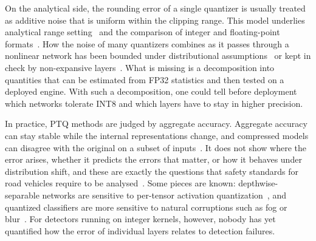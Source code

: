 \documentclass[pdflatex,sn-mathphys-num]{sn-jnl}%
\theoremstyle{thmstyleone}%
\theoremstyle{thmstyletwo}%
\theoremstyle{thmstylethree}%
\begin{document}
On the analytical side, the rounding error of a single quantizer is usually treated as additive noise that is uniform within the clipping range. This model underlies analytical range setting~\cite{banner2019aciq,nagel2021whitepaper} and the comparison of integer and floating-point formats~\cite{kuzmin2022fp8,vanbaalen2023fp8}. How the noise of many quantizers combines as it passes through a nonlinear network has been bounded under distributional assumptions~\cite{sakr2017analytical} or kept in check by non-expansive layers~\cite{lin2019defensive}. What is missing is a decomposition into quantities that can be estimated from FP32 statistics and then tested on a deployed engine. With such a decomposition, one could tell before deployment which networks tolerate INT8 and which layers have to stay in higher precision.

In practice, PTQ methods are judged by aggregate accuracy. Aggregate accuracy can stay stable while the internal representations change, and compressed models can disagree with the original on a subset of inputs~\cite{hooker2019forget}. It does not show where the error arises, whether it predicts the errors that matter, or how it behaves under distribution shift, and these are exactly the questions that safety standards for road vehicles require to be analysed~\cite{iso21448,iso8800,mohseni2022taxonomy}. Some pieces are known: depthwise-separable networks are sensitive to per-tensor activation quantization~\cite{sheng2018quantization,wu2020integer}, and quantized classifiers are more sensitive to natural corruptions such as fog or blur~\cite{xiao2023robustness,michaelis2019benchmarking,zhang2023adverse}. For detectors running on integer kernels, however, nobody has yet quantified how the error of individual layers relates to detection failures.
\end{document}
